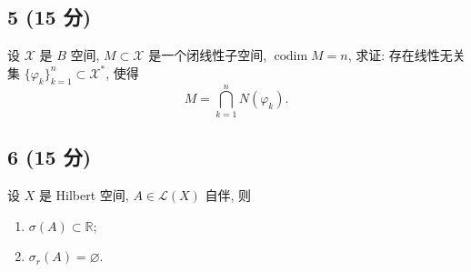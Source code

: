\documentclass[11pt, a4paper]{ctexart}
\newenvironment{problem}[1]
{\subsection*{#1}}
{}
\begin{document}
	\vspace{0.5cm}
	
	\begin{problem}{5 (15 分)}
		设 $\mathscr{X}$ 是 $B$ 空间, $M \subset \mathscr{X}$ 是一个闭线性子空间, $\operatorname{codim} M = n$, 求证: 存在线性无关集 $\{\varphi_k\}_{k=1}^{n} \subset \mathscr{X}^*$, 使得
		$$
		M = \bigcap_{k=1}^n N(\varphi_k).
		$$
	\end{problem}
	
	\vspace{0.5cm}
	
	\begin{problem}{6 (15 分)}
		设 $X$ 是 Hilbert 空间, $A \in \mathscr{L}(X)$ 自伴, 则
		\begin{enumerate}
			\item $\sigma(A) \subset \mathbb{R}$;
			\item $\sigma_r(A) = \varnothing$.
		\end{enumerate}
	\end{problem}
	
\end{document}
